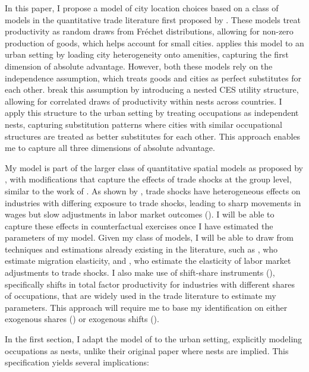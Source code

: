 \documentclass[10pt]{article}
\begin{document}
In this paper, I propose a model of city location choices based on a class of models in the quantitative trade literature first proposed by \cite{ek}. These models treat productivity as random draws from Fr\'{e}chet distributions, allowing for non-zero production of goods, which helps account for small cities. \cite{redding} applies this model to an urban setting by loading city heterogeneity onto amenities, capturing the first dimension of absolute advantage. However, both these models rely on the independence assumption, which treats goods and cities as perfect substitutes for each other. \cite{lindandramondo} break this assumption by introducing a nested CES utility structure, allowing for correlated draws of productivity within nests across countries. I apply this structure to the urban setting by treating occupations as independent nests, capturing substitution patterns where cities with similar occupational structures are treated as better substitutes for each other. This approach enables me to capture all three dimensions of absolute advantage.

My model is part of the larger class of quantitative spatial models as proposed by \cite{redding2017}, with modifications that capture the effects of trade shocks at the group level, similar to the work of \cite{galle2023}. As shown by \cite{adh2013}, trade shocks have heterogeneous effects on industries with differing exposure to trade shocks, leading to sharp movements in wages but slow adjustments in labor market outcomes (\cite{acm2010}). I will be able to capture these effects in counterfactual exercises once I have estimated the parameters of my model. Given my class of models, I will be able to draw from techniques and estimations already existing in the literature, such as \cite{albert_monras2022}, who estimate migration elasticity, and \cite{kim_vogel2020}, who estimate the elasticity of labor market adjustments to trade shocks. I also make use of shift-share instruments (\cite{bartik1991}), specifically shifts in total factor productivity for industries with different shares of occupations, that are widely used in the trade literature to estimate my parameters. This approach will require me to base my identification on either exogenous shares (\cite{pssh2020}) or exogenous shifts (\cite{bhj2020}).

In the first section, I adapt the model of \cite{lindandramondo} to the urban setting, explicitly modeling occupations as nests, unlike their original paper where nests are implied. This specification yields several implications:
\end{document}
